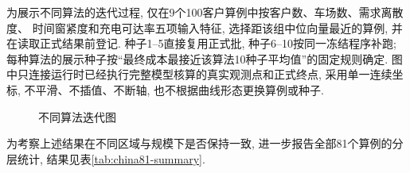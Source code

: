 为展示不同算法的迭代过程,
仅在9个100客户算例中按客户数、车场数、需求离散度、
时间窗紧度和充电可达率五项输入特征,
选择距该组中位向量最近的算例, 并在读取正式结果前登记.
种子1--5直接复用正式批, 种子6--10按同一冻结程序补跑;
每种算法的展示种子按“最终成本最接近该算法10种子平均值”的固定规则确定.
图中只连接运行时已经执行完整模型核算的真实观测点和正式终点,
采用单一连续坐标, 不平滑、不插值、不断轴,
也不根据曲线形态更换算例或种子.

\begin{table}[H]
\centering
\caption{不同算法对比表}
\label{tab:algorithm-comparison}
\setptabsetup
{}
\end{table}

\begin{figure}[H]
\centering
{}
\caption{不同算法迭代图}
\label{fig:convergence}
\end{figure}


为考察上述结果在不同区域与规模下是否保持一致,
进一步报告全部81个算例的分层统计, 结果见表\ref{tab:china81-summary}.

\begin{table}[H]
\centering
\caption{中国三大城市群算例集分层结果}
\label{tab:china81-summary}
\setptabsetup
{}
\end{table}

